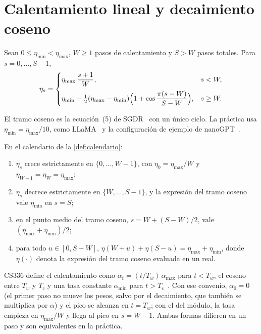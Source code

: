 \section{Calentamiento lineal y decaimiento coseno}

\begin{definicion}\label{def:calendario}
Sean $0\le\eta_{\min}<\eta_{\max}$, $W\ge 1$ pasos de calentamiento y $S>W$ pasos totales. Para $s=0,\dots,S-1$,
\[
\eta_s=\begin{cases}
\eta_{\max}\,\dfrac{s+1}{W}, & s<W,\\[3mm]
\eta_{\min}+\tfrac12(\eta_{\max}-\eta_{\min})\Bigl(1+\cos\dfrac{\pi(s-W)}{S-W}\Bigr), & s\ge W.
\end{cases}
\]
\end{definicion}

El tramo coseno es la ecuación~(5) de SGDR~\cite[§3]{sgdr} con un único ciclo. La práctica usa $\eta_{\min}=\eta_{\max}/10$, como LLaMA~\cite[§2.3]{llama} y la configuración de ejemplo de nanoGPT~\cite{nanogpt}.

\begin{proposicion}\label{prop:calendario}
En el calendario de la \cref{def:calendario}:
\begin{enumerate}
  \item $\eta_s$ crece estrictamente en $\{0,\dots,W-1\}$, con $\eta_0=\eta_{\max}/W$ y $\eta_{W-1}=\eta_W=\eta_{\max}$;
  \item $\eta_s$ decrece estrictamente en $\{W,\dots,S-1\}$, y la expresión del tramo coseno vale $\eta_{\min}$ en $s=S$;
  \item en el punto medio del tramo coseno, $s=W+(S-W)/2$, vale $(\eta_{\max}+\eta_{\min})/2$;
  \item para todo $u\in[0,S-W]$, $\eta(W+u)+\eta(S-u)=\eta_{\max}+\eta_{\min}$, donde $\eta(\cdot)$ denota la expresión del tramo coseno evaluada en un real.
\end{enumerate}
\end{proposicion}

\addtocounter{definicion}{1}%

\begin{observacion}[El convenio de CS336]\label{obs:cs336-cal}
CS336 define el calentamiento como $\alpha_t=(t/T_w)\,\alpha_{\max}$ para $t<T_w$, el coseno entre $T_w$ y $T_c$ y una tasa constante $\alpha_{\min}$ para $t>T_c$~\cite[§4.4]{cs336}. Con ese convenio, $\alpha_0=0$ (el primer paso no mueve los pesos, salvo por el decaimiento, que también se multiplica por $\alpha$) y el pico se alcanza en $t=T_w$; con el del módulo, la tasa empieza en $\eta_{\max}/W$ y llega al pico en $s=W-1$. Ambas formas difieren en un paso y son equivalentes en la práctica.
\end{observacion}

